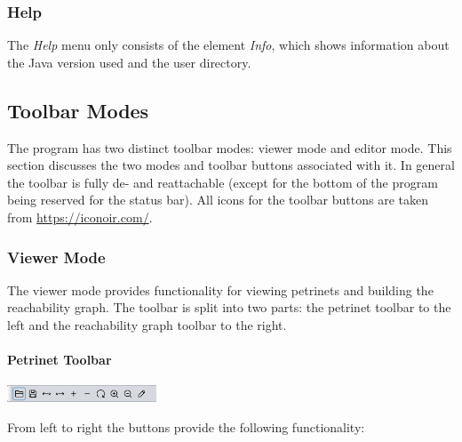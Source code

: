 \documentclass[10pt, a4paper]{article}
\begin{document}
\subsubsection{Help}

The \textit{Help} menu only consists of the element \textit{Info}, which shows information about the Java version used and the user directory.

\subsection{Toolbar Modes}
\label{label:modes}
The program has two distinct toolbar modes: viewer mode and editor mode. This section discusses the two modes and toolbar buttons associated with it. In general the toolbar is fully de- and reattachable (except for the bottom of the program being reserved for the status bar). All icons for the toolbar buttons are taken from \url{https://iconoir.com/}.

\subsubsection{Viewer Mode}

The viewer mode provides functionality for viewing petrinets and building the reachability graph. The toolbar is split into two parts: the petrinet toolbar to the left and the reachability graph toolbar to the right.

\paragraph{Petrinet Toolbar}

\includegraphics[height=0.5cm]{Viewer_Petrinet_Toolbar.png}
\label{label:viewer}

From left to right the buttons provide the following functionality:
\end{document}
